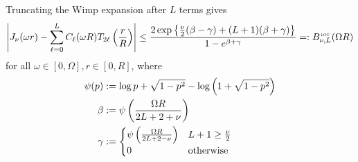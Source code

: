 \begin{lemma} \label{lem:wimp} Truncating the Wimp expansion after $L$ terms
    gives
    \begin{align} \label{eq:loc-error}
        \abs{J_\nu(\omega r) - \sum_{\ell=0}^L C_\ell(\omega R) T_{2\ell}\left( \frac{r}{R} \right)} 
        \leq \frac{2\exp\left\{ \frac{\nu}{2}(\beta - \gamma) + (L+1)(\beta + \gamma) \right\}}{1 - e^{\beta + \gamma}}
        =: \Bloc(\Omega R)
    \end{align}
    for all $\omega \in [0, \Omega], r \in [0, R]$, where
    \begin{align}
        \psi(p) &:= \log p + \sqrt{1 - p^2} - \log\left( 1 + \sqrt{1 - p^2} \right) \\
        \beta &:= \psi\left( \frac{\Omega R}{2L + 2 + \nu} \right) \\
        \gamma &:= \begin{cases}
            \psi\left( \frac{\Omega R}{2L + 2 - \nu} \right) & L + 1 \geq \frac{\nu}{2} \\
            0 & \textnormal{otherwise}
        \end{cases}
    \end{align}
\end{lemma}
